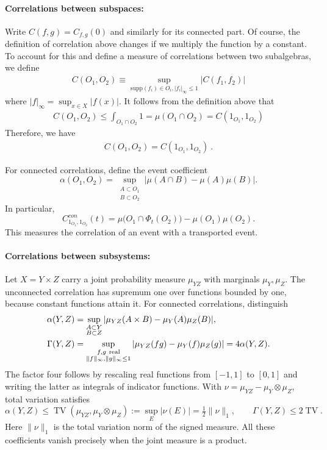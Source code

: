 \documentclass[a4paper,11pt]{article}
\theoremstyle{definition}
\newcommand{\nn}{\nonumber}
\begin{document}
\paragraph{Correlations between subspaces:} Write $C(f,g)=C_{f,g}(0)$ and similarly for its connected part. Of course, the definition of correlation above changes if we multiply the function by a constant. To account for this and define a measure of correlations between two subalgebras, we define
\begin{align}
    C(O_1,O_2)\equiv \sup_{\text{supp}(f_i)\in O_i,|f_i|_\infty\leq 1}|C(f_1,f_2)|
\end{align}
where $|f|_\infty=\sup_{x\in X}|f(x)|$. It follows from the definition above that
\begin{align}
    C(O_1,O_2)\leq \int_{O_1\cap O_2} 1=\mu(O_1\cap O_2)=C(1_{O_1},1_{O_2})
\end{align}
Therefore, we have
\begin{align}
    C(O_1,O_2)=C(1_{O_1},1_{O_2})\ .
\end{align}

For connected correlations, define the event coefficient
\begin{equation}
 \alpha(O_1,O_2)=
 \sup_{\substack{A\subset O_1\\B\subset O_2}}
 |\mu(A\cap B)-\mu(A)\mu(B)|.
\end{equation}
In particular,
\begin{equation}
 C^{con}_{1_{O_1},1_{O_2}}(t)
 =\mu\bigl(O_1\cap\Phi_t(O_2)\bigr)-\mu(O_1)\mu(O_2).
\end{equation}
This measures the correlation of an event with a transported event.

\paragraph{Correlations between subsystems:}
Let $X=Y\times Z$ carry a joint probability measure $\mu_{YZ}$ with marginals
$\mu_Y,\mu_Z$. The unconnected correlation has supremum one over functions bounded
by one, because constant functions attain it. For connected correlations, distinguish
\begin{align}
 \alpha(Y,Z)&=\sup_{\substack{A\subset Y\\B\subset Z}}
 |\mu_{YZ}(A\times B)-\mu_Y(A)\mu_Z(B)|,\nn\\
 \Gamma(Y,Z)&=\sup_{\substack{f,g\ {\rm real}\\\|f\|_\infty,\|g\|_\infty\leq1}}
 |\mu_{YZ}(fg)-\mu_Y(f)\mu_Z(g)|=4\alpha(Y,Z).
\end{align}
The factor four follows by rescaling real functions from $[-1,1]$ to $[0,1]$
and writing the latter as integrals of indicator functions. With
$\nu=\mu_{YZ}-\mu_Y\otimes\mu_Z$, total variation satisfies
\begin{equation}
 \alpha(Y,Z)\leq\operatorname{TV}(\mu_{YZ},\mu_Y\otimes\mu_Z)
 :=\sup_E|\nu(E)|=\tfrac12\|\nu\|_1,
 \qquad \Gamma(Y,Z)\leq2\operatorname{TV}.
\end{equation}
Here $\|\nu\|_1$ is the total variation norm of the signed measure. All these
coefficients vanish precisely when the joint measure is a product.
\end{document}
